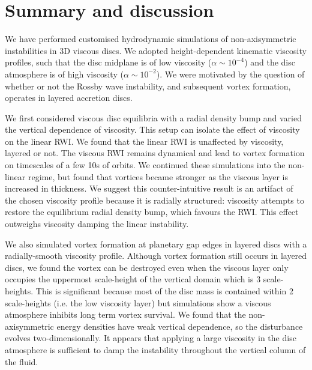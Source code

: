 \section{Summary and discussion}\label{summary}
We have performed customised hydrodynamic simulations of
non-axisymmetric instabilities in 3D viscous discs. We adopted
height-dependent kinematic viscosity profiles, such that the disc
midplane is of low viscosity ($\alpha\sim 10^{-4}$) and the disc
atmosphere is of high viscosity ($\alpha\sim 10^{-2}$). We were motivated  
by the question of whether or not the Rossby wave instability, and
subsequent vortex formation, operates in layered accretion discs.  

We first considered viscous disc equilibria with a radial density
bump and varied the vertical dependence of viscosity. 
This setup can isolate the effect of viscosity on the
linear RWI. We found that the linear RWI is unaffected by viscosity,
layered or not. The viscous RWI remains dynamical and lead to vortex
formation on timescales of a few 10s of orbits. We continued these
simulations into the non-linear regime, but found that vortices became
stronger as the viscous layer is increased in thickness. We suggest this
counter-intuitive result is an artifact of the chosen viscosity
profile because it is radially structured: viscosity attempts to
restore the equilibrium radial density bump, which favours the
RWI. This effect outweighs viscosity damping the linear instability. 

We also simulated vortex formation at planetary gap edges in layered
discs with a radially-smooth viscosity profile. %
Although vortex formation still 
occurs in layered discs, we found the vortex can be destroyed even when the viscous
layer only occupies the uppermost scale-height of the vertical domain
which is 3 scale-heights. This is significant because most of the disc
mass is contained within 2 scale-heights (i.e. the low viscosity
layer) but simulations show a viscous atmosphere inhibits long term
vortex survival.    
We found that the non-axisymmetric energy densities have
weak vertical dependence, so the disturbance evolves
two-dimensionally. It appears that applying a large viscosity in the
disc atmosphere is sufficient to damp the instability throughout the
vertical column of the fluid.

